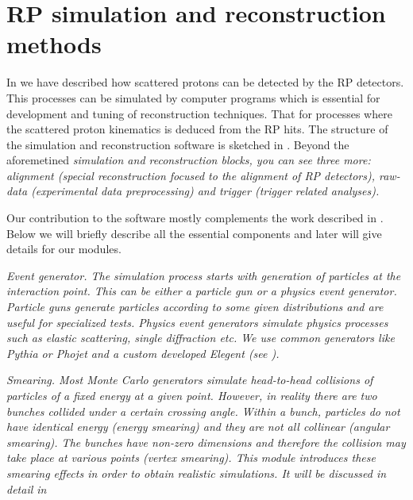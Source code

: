 \iffalse
RP, MC, IP5, CMS, T1, T2, VFAT, DIGI, RECO, LAB, LHC, LS, DPE, MC, TOTEM, RMS, ndf
\fi


\chapter{RP simulation and reconstruction methods}

In  we have described how scattered protons can be detected by the RP detectors. This processes can be simulated by computer programs which is essential for development and tuning of reconstruction techniques. That for processes where the scattered proton kinematics is deduced from the RP hits. The structure of the simulation and reconstruction software is sketched in . Beyond the aforemetined \em{simulation} and \em{reconstruction} blocks, you can see three more: \em{alignment} (special reconstruction focused to the alignment of RP detectors), \em{raw-data} (experimental data preprocessing) and \em{trigger} (trigger related analyses).


Our contribution to the software mostly complements the work described in . Below we will briefly describe all the essential components and later will give details for our modules.

\em{Event generator}.
The simulation process starts with generation of particles at the interaction point. This can be either a \em{particle gun} or a \em{physics event generator}. Particle guns generate particles according to some given distributions and are useful for specialized tests. Physics event generators simulate physics processes such as elastic scattering, single diffraction etc. We use common generators like Pythia  or Phojet  and a custom developed Elegent (see ).

\em{Smearing}.
Most Monte Carlo generators simulate head-to-head collisions of particles of a fixed energy at a given point. However, in reality there are two bunches collided under a certain crossing angle. Within a bunch, particles do not have identical energy (energy smearing) and they are not all collinear (angular smearing). The bunches have non-zero dimensions and therefore the collision may take place at various points (vertex smearing). This module introduces these smearing effects in order to obtain realistic simulations. It will be discussed in detail in 

